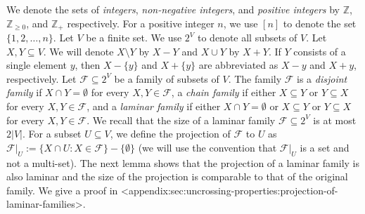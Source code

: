 \documentclass{article}
\def\Cref#1{<#1>}%
\newcommand{\indicator}{\ensuremath{\mathbbm{1}}\xspace}
\newcommand{\shubhang}[1]{{\color{blue}[{\tiny Shubhang: \bf #1}]\marginpar{\color{blue}*}}}
\newcommand{\knote}[1]{{\color{red}[{\tiny Karthik: \bf #1}]\marginpar{\color{red}*}}}
\providecommand{\calF}{\mathcal{F}}
\providecommand{\calL}{\mathcal{L}}
\providecommand{\calZ}{\mathcal{Z}}
\begin{document}

We denote the sets of 
\emph{integers}, \emph{non-negative integers}, and \emph{positive integers} by 
$\mathbb{Z}$, $\mathbb{Z}_{\geq 0}$, and $\mathbb{Z}_+$ respectively. For a positive integer $n$, we use $[n]$ to denote the set $\{1, 2, \ldots, n\}$. %
Let $V$ be a finite set. We use $2^{V}$ to denote all subsets of $V$. 
Let $X, Y\subseteq V$. We will denote $X\setminus Y$ by $X-Y$ and $X\cup Y$ by $X+Y$. If $Y$ consists of a single element $y$, then $X-\{y\}$ and $X+\{y\}$ are abbreviated as $X-y$ and $X+y$, respectively. 
Let $\calF\subseteq 2^V$ be a family of subsets of $V$. 
The family $\calF$ is 
a \emph{disjoint family} if $X\cap Y=\emptyset$ for every $X, Y\in \calF$, 
a \emph{chain family} if either $X\subseteq Y$ or $Y\subseteq X$ for every $X, Y\in \calF$, and a \emph{laminar family} if either $X\cap Y=\emptyset$ or $X\subseteq Y$ or $Y\subseteq X$ for every $X, Y\in \calF$. 
We recall that the size of a laminar family $\mathcal{F}\subseteq 2^V$ is at most $2|V|$. 
For a subset $U\subseteq V$, we define the projection of $\mathcal{F}$ to $U$ as   $\mathcal{F}|_U:=\{X\cap U: X\in \mathcal{F}\}-\{\emptyset\}$ (we will use the convention that $\mathcal{F}|_U$ is a set and not a multi-set). 
The next lemma shows that the projection of a laminar family is also laminar and the size of the projection is comparable to that of the original family. We give a proof in \Cref{appendix:sec:uncrossing-properties:projection-of-laminar-families}.  %
\end{document}
